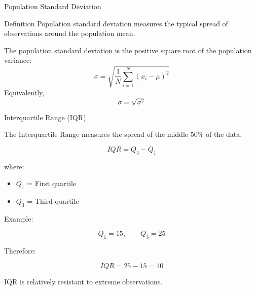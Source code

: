 \documentclass[aspectratio=169]{beamer}
\begin{document}
\begin{frame}{Population Standard Deviation}
\begin{block}{Definition}
Population standard deviation measures the typical spread of
observations around the population mean.
\end{block}

\vspace{0.2cm}
The population standard deviation is the positive square root
of the population variance:
\[
\boxed{
\sigma=
\sqrt{\frac{1}{N}\sum_{i=1}^{N}(x_i-\mu)^2}
}
\]
Equivalently,
\[
\boxed{\sigma=\sqrt{\sigma^2}}
\]
\vspace{0.3cm}
\end{frame}

\begin{frame}{Interquartile Range (IQR)}

The Interquartile Range measures the spread of the
middle 50\% of the data.

\[
\boxed{
IQR=Q_3-Q_1
}
\]

where:

\begin{itemize}
    \item $Q_1$ = First quartile
    \item $Q_3$ = Third quartile
\end{itemize}

Example:

\[
Q_1=15,\qquad Q_3=25
\]

Therefore:

\[
IQR=25-15=10
\]

IQR is relatively resistant to extreme observations.
\end{frame}
\end{document}
